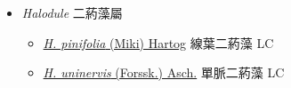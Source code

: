 
  \begin{itemize}
 \item[] \textit{Halodule} 二葯藻屬
                    
  \begin{itemize}
        \item[] \href{http://www.theplantlist.org/tpl1.1/search?q=Halodule+pinifolia}{\textit{H. pinifolia} (Miki) Hartog}   線葉二葯藻 LC
        \item[] \href{http://www.theplantlist.org/tpl1.1/search?q=Halodule+uninervis}{\textit{H. uninervis} (Forssk.) Asch.}   單脈二葯藻 LC
  \end{itemize}
  \end{itemize}
